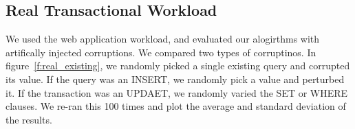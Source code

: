 \subsection{Real Transactional Workload}

We used the web application workload, and evaluated our alogirthms with artifically injected corruptions.
We compared two types of corruptinos.  In figure~\ref{f:real_existing}, we randomly picked a single existing 
query and corrupted its value.  If the query was an INSERT, we randomly pick a value and perturbed it.
If the transaction was an UPDAET, we randomly varied the SET or WHERE clauses.   We re-ran this
100 times and plot the average and standard deviation of the results.

